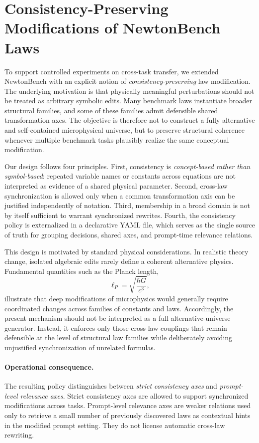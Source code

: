 \section{Consistency-Preserving Modifications of NewtonBench Laws}
\label{sec:consistent_modifications}

To support controlled experiments on cross-task transfer, we extended NewtonBench with an explicit notion of \emph{consistency-preserving} law modification. The underlying motivation is that physically meaningful perturbations should not be treated as arbitrary symbolic edits. Many benchmark laws instantiate broader structural families, and some of these families admit defensible shared transformation axes. The objective is therefore not to construct a fully alternative and self-contained microphysical universe, but to preserve structural coherence whenever multiple benchmark tasks plausibly realize the same conceptual modification.

Our design follows four principles. First, consistency is \emph{concept-based rather than symbol-based}: repeated variable names or constants across equations are not interpreted as evidence of a shared physical parameter. Second, cross-law synchronization is allowed only when a common transformation axis can be justified independently of notation. Third, membership in a broad domain is not by itself sufficient to warrant synchronized rewrites. Fourth, the consistency policy is externalized in a declarative YAML file, which serves as the single source of truth for grouping decisions, shared axes, and prompt-time relevance relations.

This design is motivated by standard physical considerations. In realistic theory change, isolated algebraic edits rarely define a coherent alternative physics. Fundamental quantities such as the Planck length,
\[
\ell_P = \sqrt{\frac{\hbar G}{c^3}},
\]
illustrate that deep modifications of microphysics would generally require coordinated changes across families of constants and laws. Accordingly, the present mechanism should not be interpreted as a full alternative-universe generator. Instead, it enforces only those cross-law couplings that remain defensible at the level of structural law families while deliberately avoiding unjustified synchronization of unrelated formulas.

\paragraph{Operational consequence.}
The resulting policy distinguishes between \emph{strict consistency axes} and \emph{prompt-level relevance axes}. Strict consistency axes are allowed to support synchronized modifications across tasks. Prompt-level relevance axes are weaker relations used only to retrieve a small number of previously discovered laws as contextual hints in the modified prompt setting. They do not license automatic cross-law rewriting.

